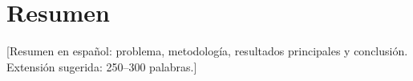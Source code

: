 
\chapter*{Resumen}

[Resumen en español: problema, metodología, resultados principales y conclusión.
Extensión sugerida: 250–300 palabras.]

\clearpage
